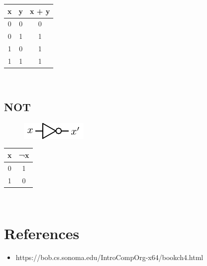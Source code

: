 \begin{tabular}{c c c}
	\hline
	\textbf{x} & \textbf{y} & \textbf{x + y} \\ 
	\hline
	0 & 0 & 0 \\
	0 & 1 & 1 \\
	1 & 0 & 1 \\
	1 & 1 & 1 \\
	\hline 
\end{tabular} \\

\subsection{NOT}

\begin{figure}[h!]
	\includegraphics{./img/not.png}
\end{figure}

\begin{tabular}{c c}
	\hline
	\textbf{x} & \textbf{¬x} \\ 
	\hline
	0 & 1  \\
	1 & 0  \\
	\hline 
\end{tabular} \\

\section{References}

\begin{itemize}
	\item https://bob.cs.sonoma.edu/IntroCompOrg-x64/bookch4.html
\end{itemize}